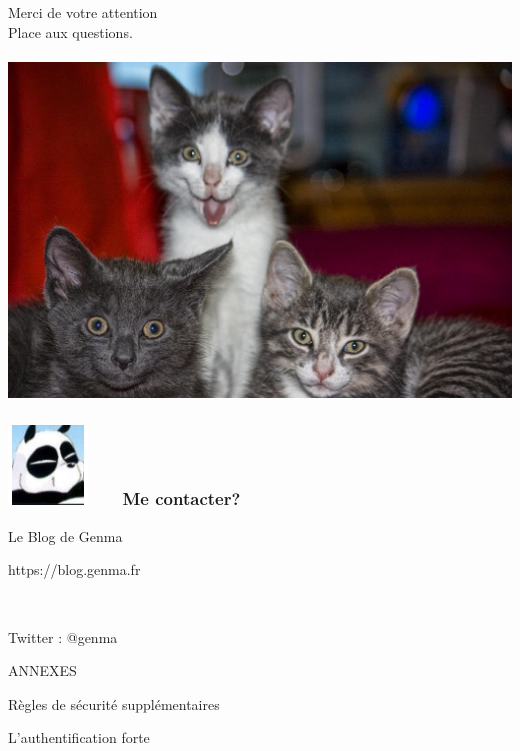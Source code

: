 \documentclass{beamer}
\begin{document}
\begin{frame}
\begin{center}
\Huge{Merci de votre attention}
\\
\Huge{Place aux questions.}
\\~\\
\includegraphics[scale=0.2] {./images/chat.jpg}
\end{center}
\end{frame}

\begin{frame}
\frametitle{\includegraphics[scale=0.4]{./images/Genma.jpg} \ \ \  Me contacter?}
\Huge{\centerline{Le Blog de Genma}}
\Huge{\centerline{https://blog.genma.fr}}
\Huge{\centerline{~}}
\Huge{\centerline{Twitter : @genma}}
\end{frame}


\begin{frame}
\begin{center}
\Huge{ANNEXES}
\end{center}
\end{frame}

\begin{frame}
\begin{center}
\Huge{Règles de sécurité supplémentaires}
\end{center}
\end{frame}
\begin{frame}
\Huge{\centerline{L'authentification forte}}
\end{frame}
\end{document}
